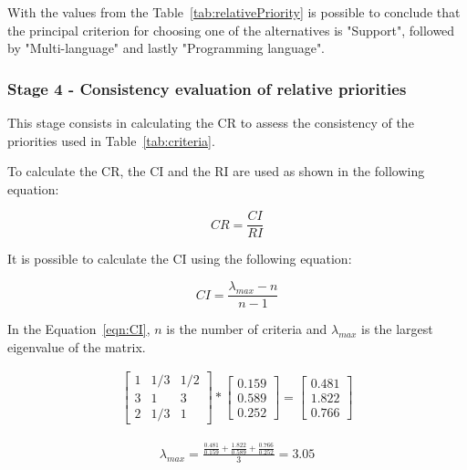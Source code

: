 With the values from the Table~\ref{tab:relativePriority} is possible to conclude that the principal criterion for choosing one of the alternatives is "Support", followed by "Multi-language" and lastly "Programming language".

\subsubsection{Stage 4 - Consistency evaluation of relative priorities}

This stage consists in calculating the \gls{CR} to assess the consistency of the priorities used in Table~\ref{tab:criteria}.

To calculate the \gls{CR}, the \gls{CI} and the \gls{RI} are used as shown in the following equation:

\begin{equation}
    CR = \frac{CI}{RI}
\end{equation}

It is possible to calculate the \gls{CI} using the following equation:

\begin{equation}
    \label{eqn:CI}
    CI = \frac{\lambda_{max}-n}{n-1}
\end{equation}

In the Equation~\ref{eqn:CI}, $n$ is the number of criteria and $\lambda_{max}$ is the largest eigenvalue of the matrix.

\begin{gather}
    \label{eqn:preLambda}
    \begin{bmatrix}
        1 & 1/3 & 1/2 \\
        3 & 1 & 3 \\
        2 & 1/3 & 1
    \end{bmatrix}
    *
    \begin{bmatrix}
      0.159 \\
      0.589 \\
      0.252
    \end{bmatrix}
      =
    \begin{bmatrix}
      0.481 \\
      1.822 \\
      0.766
    \end{bmatrix}
\end{gather}


\begin{gather}
    \label{eqn:lambdaMax}
    \lambda_{max} = 
    \frac{\frac{0.481}{0.159} + \frac{1.822}{0.589} + \frac{0.766}{0.252}}{3}
    = 3.05
\end{gather}

